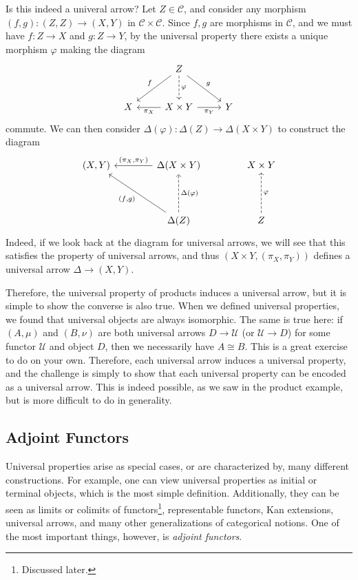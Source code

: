 Is this indeed a univeral arrow? Let $Z\in \mathcal{C} $, and consider any morphism $(f,g): (Z,Z) \to (X,Y)$ in $\mathcal{C} \times \mathcal{C} $. Since $f,g$ are morphisms in $\mathcal{C} $, and we must have $f : Z \to X$ and $g : Z \to Y$, by the universal property there exists a unique morphism $\varphi $ making the diagram
\[\begin{tikzcd}[row sep = 2.5em, column sep = 2.5em]
 & Z\ar[" f "', dl] \ar[" g ", dr]\ar[dashed, " \varphi  ", d]  &  \\
X & X\times Y\ar[" \pi _X ", l] \ar[" \pi _Y "', r]  & Y
\end{tikzcd}\]
commute. We can then consider $\Delta (\varphi ): \Delta (Z) \to \Delta (X\times Y)$ to construct the diagram
\[\begin{tikzcd}[row sep = 4em, column sep = 4em]
(X,Y) & \Delta (X\times Y)\ar[" (\pi _X\text{,}\pi _Y) "', l]  & X\times Y \\
 & \Delta (Z)\ar[" (f\text{,}g) ", ul] \ar[" \Delta (\varphi ) "', dashed, u]  & Z\ar[" \varphi  "', dashed, u] 
\end{tikzcd}\]
Indeed, if we look back at the diagram for universal arrows, we will see that this satisfies the property of universal arrows, and thus $(X\times Y,(\pi _X,\pi _Y))$ defines a universal arrow $\Delta \to (X,Y)$.

Therefore, the universal property of products induces a universal arrow, but it is simple to show the converse is also true. When we defined universal properties, we found that universal objects are always isomorphic. The same is true here: if $(A,\mu )$ and $(B,\nu )$ are both universal arrows $D\to \mathcal{U} $ (or $\mathcal{U} \to D$) for some functor $\mathcal{U} $ and object $D$, then we necessarily have $A\cong B$. This is a great exercise to do on your own. Therefore, each universal arrow induces a universal property, and the challenge is simply to show that each universal property can be encoded as a universal arrow. This is indeed possible, as we saw in the product example, but is more difficult to do in generality.

\subsection{Adjoint Functors}

Universal properties arise as special cases, or are characterized by, many different constructions. For example, one can view universal properties as initial or terminal objects, which is the most simple definition. Additionally, they can be seen as limits or colimits of functors\footnote{Discussed later.}, representable functors, Kan extensions, universal  arrows, and many other generalizations of categorical notions. One of the most important things, however, is \emph{adjoint functors}.

